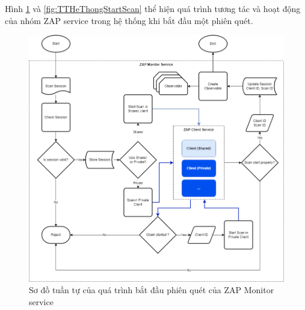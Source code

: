 \smallskip
Hình \ref{fig:TTZapMonitorStartScan} và \ref{fig:TTHeThongStartScan} thể hiện quá trình tương tác và hoạt động của nhóm ZAP service trong hệ thống khi bắt đầu một phiên quét.

\begin{figure}[H]
      \centering
      \includegraphics[width=\textwidth]{applied-thesis-chapters/chapter-3/Sơ đồ tuần tự của quá trình bắt đầu phiên quét của ZAP Monitor service.png}
      \caption{Sơ đồ tuần tự của quá trình bắt đầu phiên quét của ZAP Monitor service}
      \label{fig:TTZapMonitorStartScan}
\end{figure}


